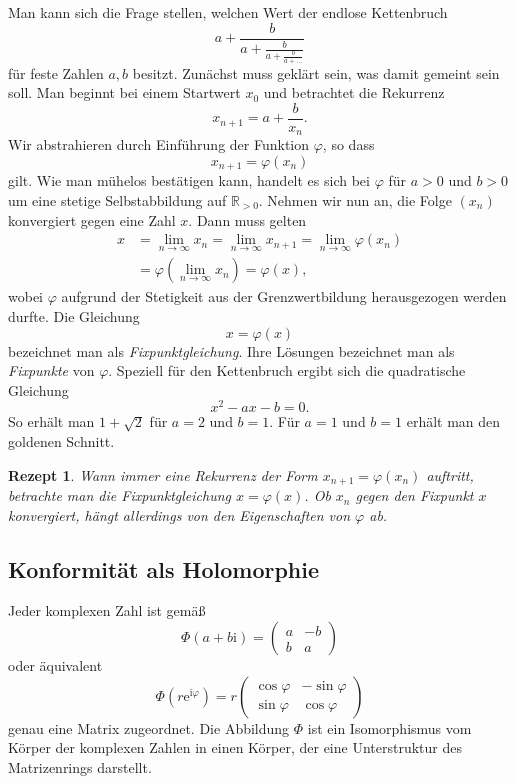 \documentclass[a4paper,10pt,fleqn,twocolumn,twoside,dvipdfmx]{scrartcl}
\theoremstyle{rmbox}
\newtheorem{Rezept}{Rezept}[section]
\newcommand{\ee}{\mathrm{e}}
\newcommand{\ui}{\mathrm{i}}
\newcommand{\R}{\mathbb R}
\begin{document}
Man kann sich die Frage stellen, welchen Wert der endlose
Kettenbruch
\[a+\frac{b}{a+\frac{b}{a+\frac{b}{a+\ldots}}}\]
für feste Zahlen $a,b$ besitzt. Zunächst muss geklärt sein, was
damit gemeint sein soll. Man beginnt bei einem Startwert $x_0$
und betrachtet die Rekurrenz
\[x_{n+1} = a+\frac{b}{x_n}.\]
Wir abstrahieren durch Einführung der Funktion $\varphi$, so dass
\[x_{n+1} = \varphi(x_n)\]
gilt. Wie man mühelos bestätigen kann, handelt es sich bei $\varphi$
für $a>0$ und $b>0$ um eine stetige Selbstabbildung auf $\R_{>0}$.
Nehmen wir nun an, die Folge $(x_n)$ konvergiert gegen eine Zahl $x$.
Dann muss gelten
\begin{align*}
x &= \lim_{n\to\infty} x_{n} = \lim_{n\to\infty} x_{n+1}
= \lim_{n\to\infty}\varphi(x_n)\\
&= \varphi(\lim_{n\to\infty} x_n) = \varphi(x),
\end{align*}
wobei $\varphi$ aufgrund der Stetigkeit aus der Grenzwertbildung
herausgezogen werden durfte. Die Gleichung
\[x = \varphi(x)\]
bezeichnet man als \emph{Fixpunktgleichung}. Ihre Lösungen
bezeichnet man als \emph{Fixpunkte} von $\varphi$. Speziell für den
Kettenbruch ergibt sich die quadratische Gleichung
\[x^2 - ax - b = 0.\]
So erhält man $1+\sqrt{2}$ für $a=2$ und $b=1$.
Für $a=1$ und $b=1$ erhält man den goldenen Schnitt.

\begin{Rezept}
Wann immer eine Rekurrenz der Form $x_{n+1} = \varphi(x_n)$
auftritt, betrachte man die Fixpunktgleichung $x = \varphi(x)$. Ob
$x_n$ gegen den Fixpunkt $x$ konvergiert, hängt allerdings von den
Eigenschaften von $\varphi$ ab.
\end{Rezept}


\subsection{Konformität als Holomorphie}

Jeder komplexen Zahl ist gemäß
\[\Phi(a+b\ui) = \begin{pmatrix}a & -b\\ b & a\end{pmatrix}\]
oder äquivalent
\[\Phi(r\ee^{\ui\varphi}) = r\begin{pmatrix}
\cos\varphi & -\sin\varphi\\
\sin\varphi & \cos\varphi
\end{pmatrix}\]
genau eine Matrix zugeordnet. Die Abbildung $\Phi$ ist ein
Isomorphismus vom Körper der komplexen Zahlen in einen Körper,
der eine Unterstruktur des Matrizenrings darstellt.
\end{document}
